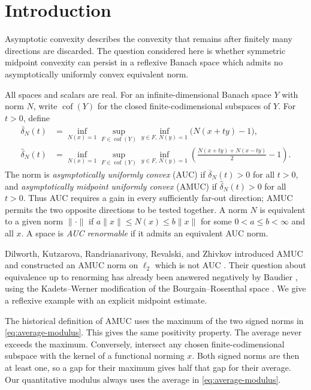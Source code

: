 \section{Introduction}\label{sec:introduction}

Asymptotic convexity describes the convexity that remains after finitely
many directions are discarded. The question considered here is whether
symmetric midpoint convexity can persist in a reflexive Banach space
which admits no asymptotically uniformly convex equivalent norm.

All spaces and scalars are real. For an infinite-dimensional Banach
space $Y$ with norm $N$, write $\operatorname{cof}(Y)$ for the closed
finite-codimensional subspaces of $Y$. For $t>0$, define
\begin{align}
 \overline\delta_N(t)
 &=\inf_{N(x)=1}\sup_{F\in\operatorname{cof}(Y)}
   \inf_{y\in F,\,N(y)=1}\bigl(N(x+ty)-1\bigr),
   \label{eq:auc-modulus}\\
 \widehat\delta_N(t)
 &=\inf_{N(x)=1}\sup_{F\in\operatorname{cof}(Y)}
   \inf_{y\in F,\,N(y)=1}
   \left(\frac{N(x+ty)+N(x-ty)}2-1\right).
   \label{eq:average-modulus}
\end{align}
The norm is \emph{asymptotically uniformly convex} (AUC) if
$\overline\delta_N(t)>0$ for all $t>0$, and \emph{asymptotically
midpoint uniformly convex} (AMUC) if $\widehat\delta_N(t)>0$ for all
$t>0$. Thus AUC requires a gain in every sufficiently far-out direction;
AMUC permits the two opposite directions to be tested together. A norm
$N$ is equivalent to a given norm $\|\cdot\|$ if
$a\|x\|\le N(x)\le b\|x\|$ for some $0<a\le b<\infty$ and
all $x$. A space is \emph{AUC renormable} if it admits an equivalent
AUC norm.

Dilworth, Kutzarova, Randrianarivony, Revalski, and Zhivkov introduced
AMUC and constructed an AMUC norm on $\ell_2$ which is not AUC
\cite[Definition~2.2 and Theorem~2.4]{DKRRZ2016}. Their question about
equivalence up to renorming \cite[Section~5]{DKRRZ2016} has already
been answered negatively by Baudier \cite[Theorem~1 and Corollary~1]{Baudier2026},
using the Kadets--Werner modification of the Bourgain--Rosenthal space
\cite[Theorem~2.5]{KW2004}. We give a reflexive example with an explicit
midpoint estimate.

The historical definition of AMUC uses the maximum of the two signed
norms in \eqref{eq:average-modulus}. This gives the same positivity
property. The average never exceeds the maximum. Conversely, intersect
any chosen finite-codimensional subspace with the kernel of a functional
norming $x$. Both signed norms are then at least one, so a gap for their
maximum gives half that gap for their average. Our quantitative modulus
always uses the average in \eqref{eq:average-modulus}.

